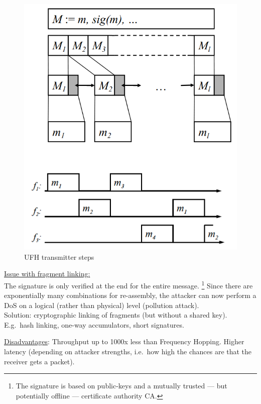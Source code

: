 \begin{figure}[h]
	\centering
	\includegraphics[scale=0.4]{images/3-ufh.png}
	\caption{UFH transmitter steps}%
	\label{fig:ufh}
\end{figure}

\underline{Issue with fragment linking:} \\
The signature is only verified at the end for the entire message.%
\footnote{The signature is based on public-keys and a mutually trusted --- but potentially offline --- certificate authority CA.}
Since there are exponentially many combinations for re-assembly, the attacker can now perform a DoS on a logical (rather than physical) level (pollution attack).
\\
Solution: cryptographic linking of fragments (but without a shared key).
E.g.\ hash linking, one-way accumulators, short signatures.

\underline{Disadvantages}:
Throughput up to 1000x less than Frequency Hopping.
Higher latency (depending on attacker strengths, i.e.\ how high the chances are that the receiver gets a packet).

